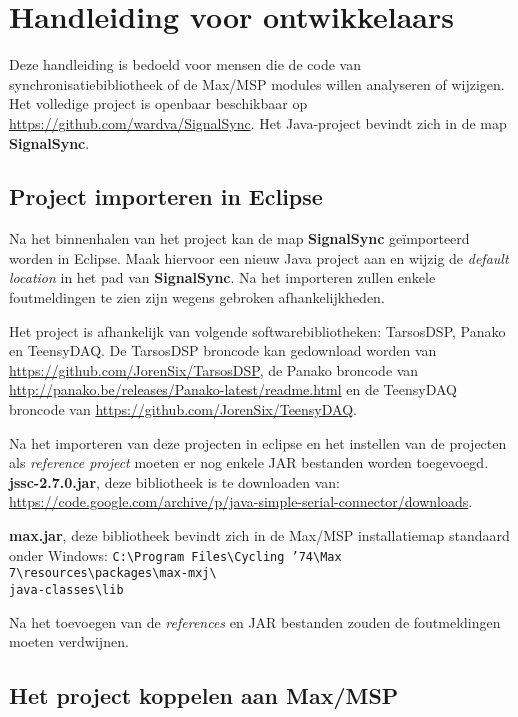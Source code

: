 \chapter{Handleiding voor ontwikkelaars}
\label{appendix-g}

Deze handleiding is bedoeld voor mensen die de code van synchronisatiebibliotheek of de Max/MSP modules willen analyseren of wijzigen. Het volledige project is openbaar beschikbaar op \url{https://github.com/wardva/SignalSync}. Het Java-project bevindt zich in de map \textbf{SignalSync}.

\section*{Project importeren in Eclipse}

Na het binnenhalen van het project kan de map \textbf{SignalSync} geïmporteerd worden in Eclipse. Maak hiervoor een nieuw Java project aan en wijzig de \textit{default location} in het pad van \textbf{SignalSync}. Na het importeren zullen enkele foutmeldingen te zien zijn wegens gebroken afhankelijkheden. 

Het project is afhankelijk van volgende softwarebibliotheken: TarsosDSP, Panako en TeensyDAQ. De TarsosDSP broncode kan gedownload worden van \url{https://github.com/JorenSix/TarsosDSP}, de Panako broncode van \url{http://panako.be/releases/Panako-latest/readme.html} en de TeensyDAQ broncode van \url{https://github.com/JorenSix/TeensyDAQ}. 

Na het importeren van deze projecten in eclipse en het instellen van de projecten als \textit{reference project} moeten er nog enkele JAR bestanden worden toegevoegd. 
\newpage
\textbf{jssc-2.7.0.jar}, deze bibliotheek is te downloaden van: \url{https://code.google.com/archive/p/java-simple-serial-connector/downloads}.

\textbf{max.jar}, deze bibliotheek bevindt zich in de Max/MSP installatiemap standaard onder Windows: \texttt{C:\textbackslash Program Files\textbackslash Cycling '74\textbackslash Max 7\textbackslash resources\textbackslash packages\textbackslash max-mxj\textbackslash \\ java-classes\textbackslash lib}

Na het toevoegen van de \textit{references} en JAR bestanden zouden de foutmeldingen moeten verdwijnen.

\section*{Het project koppelen aan Max/MSP}

